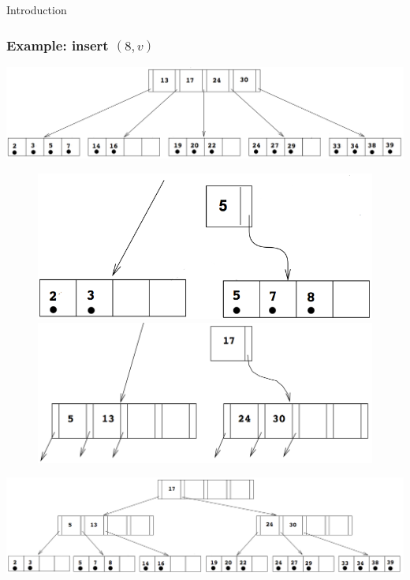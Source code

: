 \documentclass{beamer}
\begin{document}
\begin{section}{Introduction}
    \begin{frame}
      \frametitle{Example: insert $(8,v)$}
      \vspace{-1em}
      \begin{center}
      \includegraphics[scale=0.17]{B+Tree.png}
      \end{center}
      \pause
      \vspace{-2em}
      \begin{figure}[!ht]
        \centering
        \begin{center}
          \includegraphics[valign=t,scale=0.15]{B+Tree_op1.png}
          \quad
          \pause
          \includegraphics[valign=t,scale=0.15]{B+Tree_op2.png}
        \end{center}
      \end{figure}
      \pause
      \begin{center}
      \includegraphics[scale=0.2]{B+Tree_op3.png}
      \end{center}
    \end{frame}
  \end{section}
\end{document}
